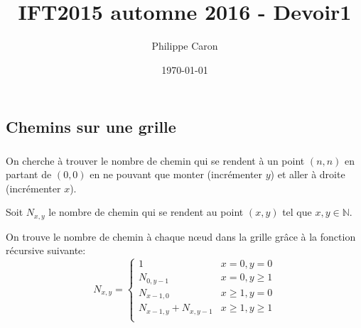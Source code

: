 \documentclass{article}
\title{IFT2015 automne 2016 - Devoir1} %
\author{Philippe Caron}
\date{\today}
\begin{document}
\maketitle

\subsection{Chemins sur une grille}
\subsubsection{}
On cherche à trouver le nombre de chemin qui se rendent à un point $(n, n)$ en partant de $(0, 0)$ en ne pouvant que monter (incrémenter $y$) et aller à droite (incrémenter $x$).
\begin{center}
  Soit $N_{x,y}$ le nombre de chemin qui se rendent au point $(x, y)$ tel que $ x, y \in \mathbb{N}$.
\end{center}
On trouve le nombre de chemin à chaque n\oe{}ud dans la grille grâce à la fonction récursive suivante:
\begin{equation}
  N_{x,y} =
  \begin{cases}
    1 & x = 0, y = 0\\
    N_{0, y - 1} & x = 0, y \geq 1\\
    N_{x - 1, 0} & x \geq 1, y = 0\\
    N_{x - 1, y} + N_{x, y - 1} & x \geq 1, y \geq 1\\
  \end{cases}
\end{equation}
\end{document}
